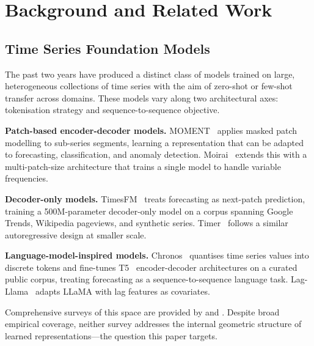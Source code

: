 
\section{Background and Related Work}
\label{sec:background}

\subsection{Time Series Foundation Models}
\label{sec:bg_tsfm}

The past two years have produced a distinct class of models trained on large,
heterogeneous collections of time series with the aim of zero-shot or few-shot
transfer across domains.
These models vary along two architectural axes: tokenisation strategy and
sequence-to-sequence objective.

\textbf{Patch-based encoder-decoder models.}
MOMENT~\cite{goswami2024moment} applies masked patch modelling to sub-series
segments, learning a representation that can be adapted to forecasting,
classification, and anomaly detection.
Moirai~\cite{woo2024moirai} extends this with a multi-patch-size architecture
that trains a single model to handle variable frequencies.

\textbf{Decoder-only models.}
TimesFM~\cite{das2024timesfm} treats forecasting as next-patch prediction,
training a 500M-parameter decoder-only model on a corpus spanning Google
Trends, Wikipedia pageviews, and synthetic series.
Timer~\cite{liu2024timer} follows a similar autoregressive design at smaller scale.

\textbf{Language-model-inspired models.}
Chronos~\cite{ansari2024chronos} quantises time series values into discrete tokens
and fine-tunes T5~\cite{raffel2020t5} encoder-decoder architectures on a curated
public corpus, treating forecasting as a sequence-to-sequence language task.
Lag-Llama~\cite{rasul2024lagllama} adapts LLaMA with lag features as covariates.

Comprehensive surveys of this space are provided by
\citet{jin2023large} and \citet{liang2024foundation}.
Despite broad empirical coverage, neither survey addresses the internal geometric
structure of learned representations---the question this paper targets.

